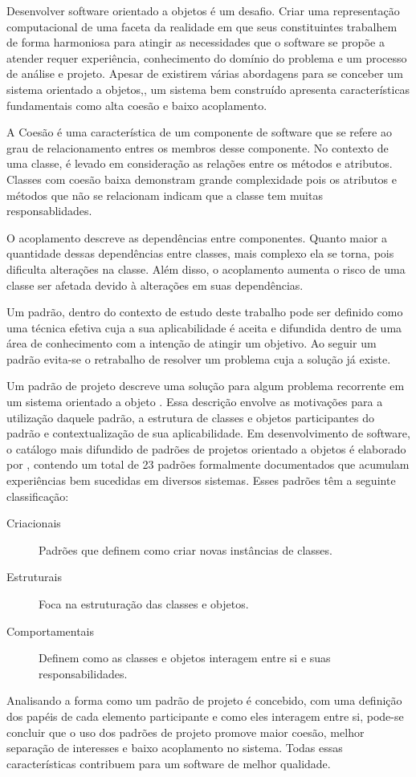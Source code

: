 \documentclass[conference]{IEEEtran}
\begin{document}
Desenvolver software orientado a objetos é um desafio. Criar uma representação
computacional de uma faceta da realidade em que seus constituintes trabalhem de
forma harmoniosa para atingir as necessidades que o software se propõe a
atender requer experiência, conhecimento do domínio do problema e um processo de
análise e projeto. Apesar de existirem várias abordagens para se conceber um
sistema orientado a objetos\cite{evans2004ddd},\cite{gomma11}, um sistema bem
construído apresenta características fundamentais como alta coesão e
baixo acoplamento.

A Coesão é uma característica de um componente de software que se refere ao grau
de relacionamento entres os membros desse componente. No contexto de uma classe,
é levado em consideração as relações entre os métodos e atributos. Classes com
coesão baixa demonstram grande complexidade pois os atributos e métodos que não
se relacionam indicam que a classe tem muitas responsablidades.

O acoplamento descreve as dependências entre componentes. Quanto maior a
quantidade dessas dependências entre classes, mais complexo ela se torna, pois
dificulta  alterações na classe. Além disso, o acoplamento aumenta o risco de
uma classe ser afetada devido à alterações em suas dependências.

Um padrão, dentro do contexto de estudo deste trabalho pode ser definido
como uma técnica efetiva cuja a sua aplicabilidade é aceita e difundida dentro
de uma área de conhecimento com a intenção de atingir um
objetivo\cite{MetskerWake06}. Ao seguir um padrão evita-se o retrabalho de
resolver um problema cuja a solução já existe.

Um padrão de projeto descreve uma solução para algum problema recorrente em um
sistema orientado a objeto \cite{gof}. Essa descrição envolve as motivações para
a utilização daquele padrão, a estrutura de classes e objetos participantes do
padrão e contextualização de sua aplicabilidade. Em desenvolvimento de software,
o catálogo mais difundido de padrões de projetos orientado a objetos é elaborado
por , contendo um total de 23 padrões formalmente documentados
que acumulam experiências bem sucedidas em diversos sistemas. Esses padrões têm
a seguinte classificação:

\begin{description}
\item[Criacionais] Padrões que definem como criar novas instâncias de classes.
\item[Estruturais] Foca na estruturação das classes e objetos.
\item[Comportamentais] Definem como as classes e objetos interagem entre si e
suas responsabilidades.
\end{description}
Analisando a forma como um padrão de projeto é concebido, com uma definição
dos papéis de cada elemento participante e como eles interagem entre si,
pode-se concluir que o uso dos padrões de projeto promove maior coesão, melhor
separação de interesses e baixo acoplamento no sistema. Todas essas
características contribuem para um software de melhor qualidade.
\end{document}

